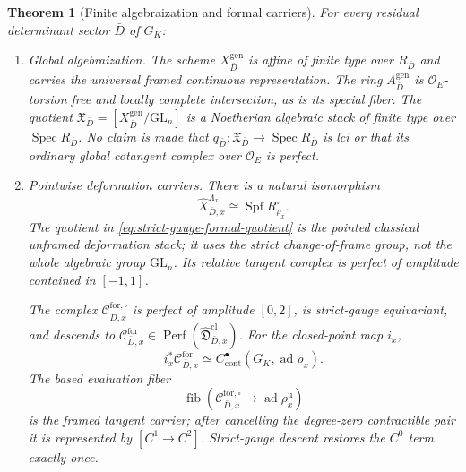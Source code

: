 \documentclass[11pt]{article}
\newtheorem{theorem}{Theorem}[section]
\theoremstyle{definition}
\begin{document}
\begin{theorem}[Finite algebraization and formal carriers]\label{thm:finite-lci-ch-atlas}
For every residual determinant sector $\bar D$ of $G_K$:
\begin{enumerate}[label=\textnormal{(\roman*)}]
\item \emph{Global algebraization.}
The scheme $X_{\bar D}^{\mathrm{gen}}$ is affine of finite type over $R_{\bar D}$ and carries the universal framed continuous representation.  The ring $A_{\bar D}^{\mathrm{gen}}$ is $\mathcal O_E$-torsion free and locally complete intersection, as is its special fiber.  The quotient
$\mathfrak X_{\bar D}=[X_{\bar D}^{\mathrm{gen}}/\mathrm{GL}_n]$
is a Noetherian algebraic stack of finite type over $\operatorname{Spec}R_{\bar D}$.  No claim is made that
$q_{\bar D}:\mathfrak X_{\bar D}\to\operatorname{Spec}R_{\bar D}$
is lci or that its ordinary global cotangent complex over $\mathcal O_E$ is perfect.

\item \emph{Pointwise deformation carriers.}
There is a natural isomorphism
\begin{equation}\label{eq:coefficient-expanded-equals-deformation}
\widehat X^{\Lambda_x}_{\bar D,x}
\cong\operatorname{Spf}R_{\rho_x}^{\square}.
\end{equation}
The quotient in \eqref{eq:strict-gauge-formal-quotient} is the pointed classical unframed deformation stack; it uses the strict change-of-frame group, not the whole algebraic group $\mathrm{GL}_n$.  Its relative tangent complex is perfect of amplitude contained in $[-1,1]$.

The complex $\mathcal C^{\mathrm{for},\square}_{\bar D,x}$ is perfect of amplitude $[0,2]$, is strict-gauge equivariant, and descends to
$\mathcal C^{\mathrm{for}}_{\bar D,x}\in\operatorname{Perf}(\widehat{\mathfrak D}^{\mathrm{cl}}_{\bar D,x})$.
For the closed-point map $i_x$,
\begin{equation}\label{eq:formal-tangent-closed-fiber}
i_x^*\mathcal C^{\mathrm{for}}_{\bar D,x}
\simeq C^\bullet_{\mathrm{cont}}(G_K,\operatorname{ad}\rho_x).
\end{equation}
The based evaluation fiber
\[
\operatorname{fib}\!\left(
\mathcal C^{\mathrm{for},\square}_{\bar D,x}
\longrightarrow\operatorname{ad}\rho_x^{\mathrm u}
\right)
\]
is the framed tangent carrier; after cancelling the degree-zero contractible pair it is represented by $[C^1\to C^2]$.  Strict-gauge descent restores the $C^0$ term exactly once.


\end{enumerate}
\end{theorem}
\end{document}
